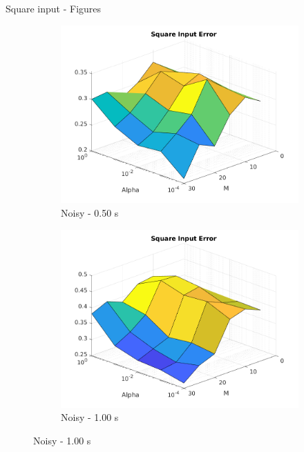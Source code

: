 \documentclass{beamer}
\begin{document}
\begin{frame}{Square input - Figures}
\begin{figure}
        \begin{subfigure}[b]{0.3\textwidth}
            \centering
            \includegraphics[width=\textwidth]{Figures_Noisy/figure_square_T_0.50.png}
            \caption{Noisy - 0.50 s}
            \label{fig:noisy_square_050}
        \end{subfigure}
        \hfill
        \begin{subfigure}[b]{0.3\textwidth}
            \centering
            \includegraphics[width=\textwidth]{Figures_Noisy/figure_square_T_1.00.png}
            \caption{Noisy - 1.00 s}
            \label{fig:noisy_square_100}
        \end{subfigure}
        \label{fig:clean_square}
    \end{figure}
\end{frame}
\end{document}
